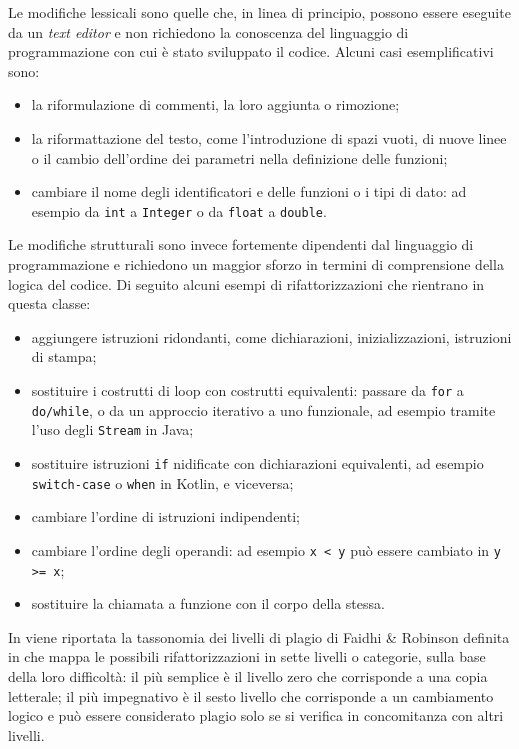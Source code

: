 Le modifiche lessicali sono quelle che, in linea di principio, possono essere eseguite da un \textit{text editor} e non richiedono la conoscenza del linguaggio di programmazione con cui è stato sviluppato il codice.
%
Alcuni casi esemplificativi sono:
\begin{itemize}
    \item la riformulazione di commenti, la loro aggiunta o rimozione;
    \item la riformattazione del testo, come l'introduzione di spazi vuoti, di nuove linee o il cambio dell'ordine dei parametri nella definizione delle funzioni;
    \item cambiare il nome degli identificatori e delle funzioni o i tipi di dato: ad esempio da \texttt{int} a \texttt{Integer} o da \texttt{float} a \texttt{double}.
\end{itemize}

Le modifiche strutturali sono invece fortemente dipendenti dal linguaggio di programmazione e richiedono un maggior sforzo in termini di comprensione della logica del codice.
%
Di seguito alcuni esempi di rifattorizzazioni che rientrano in questa classe:
\begin{itemize}
    \item aggiungere istruzioni ridondanti, come dichiarazioni, inizializzazioni, istruzioni di stampa;
    \item sostituire i costrutti di loop con costrutti equivalenti: passare da \texttt{for} a \texttt{do/while}, o da un approccio iterativo a uno funzionale, ad esempio tramite l'uso degli \texttt{Stream} in Java;
    \item sostituire istruzioni \texttt{if} nidificate con dichiarazioni equivalenti, ad esempio \texttt{switch-case} o \texttt{when} in Kotlin, e viceversa;
    \item cambiare l'ordine di istruzioni indipendenti;
    \item cambiare l'ordine degli operandi: ad esempio \texttt{x < y} può essere cambiato in \texttt{y >= x};
    \item sostituire la chiamata a funzione con il corpo della stessa.
\end{itemize}

In  viene riportata la tassonomia dei livelli di plagio di Faidhi \& Robinson definita in \cite{faidhi-robinson-1987} che mappa le possibili rifattorizzazioni in sette livelli o categorie, sulla base della loro difficoltà: il più semplice è il livello zero che corrisponde a una copia letterale; il più impegnativo è il sesto livello che corrisponde a un cambiamento logico e può essere considerato plagio solo se si verifica in concomitanza con altri livelli.

